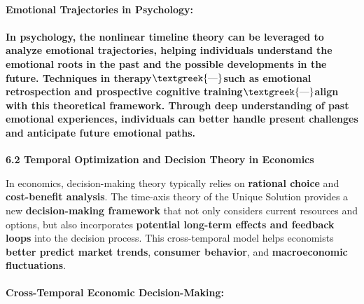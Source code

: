 \documentclass[a4paper]{article}
\begin{document}
\paragraph[Emotional Trajectories in Psychology:]{\textbf{Emotional Trajectories in Psychology:}}
\paragraph[In psychology, the nonlinear timeline theory can be leveraged to analyze emotional trajectories, helping
individuals understand the emotional roots in the past and the possible developments in the future. Techniques in
therapy$\text{\textgreek{—}}$such as emotional retrospection and prospective cognitive
training$\text{\textgreek{—}}$align with this theoretical framework. Through deep understanding of past emotional
experiences, individuals can better handle present challenges and anticipate future emotional paths.]{In psychology,
the nonlinear timeline theory can be leveraged to \textbf{analyze emotional trajectories}, helping individuals
understand the \textbf{emotional roots in the past} and the \textbf{possible developments in the future}. Techniques in
therapy$\text{\textgreek{—}}$such as \textbf{emotional retrospection} and \textbf{prospective cognitive
training}$\text{\textgreek{—}}$align with this theoretical framework. Through deep understanding of past emotional
experiences, individuals can better handle present challenges and \textbf{anticipate future emotional paths}.}
\textbf{6.2 Temporal Optimization and Decision Theory in Economics}

In economics, decision-making theory typically relies on \textbf{rational choice} and \textbf{cost-benefit analysis}.
The time-axis theory of the Unique Solution provides a new \textbf{decision-making framework} that not only considers
current resources and options, but also incorporates \textbf{potential long-term effects and feedback loops} into the
decision process. This cross-temporal model helps economists \textbf{better predict market trends}, \textbf{consumer
behavior}, and \textbf{macroeconomic fluctuations}.

\paragraph[Cross{}-Temporal Economic Decision{}-Making:]{\textbf{Cross-Temporal Economic Decision-Making:}}
\end{document}
